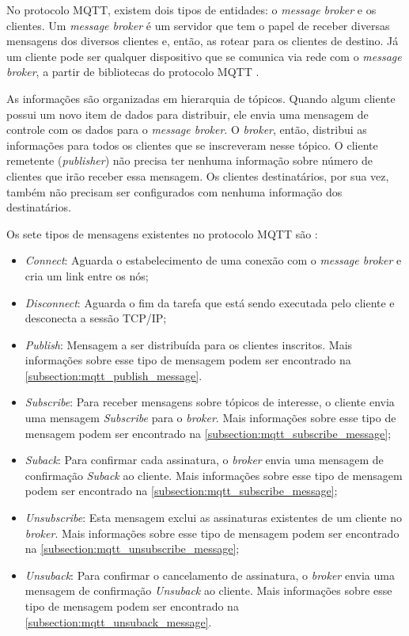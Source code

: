 No protocolo MQTT, existem dois tipos de entidades: o \textit{message broker} e os clientes. Um \textit{message broker} é um servidor que tem o papel de receber diversas mensagens dos diversos clientes e, então, as rotear para os clientes de destino. Já um cliente pode ser qualquer dispositivo que se comunica via rede com o \textit{message broker}, a partir de bibliotecas do protocolo MQTT \cite{ref:025}.

As informações são organizadas em hierarquia de tópicos. Quando algum cliente possui um novo item de dados para distribuir, ele envia uma mensagem de controle com os dados para o \textit{message broker}. O \textit{broker}, então, distribui as informações para todos os clientes que se inscreveram nesse tópico. O cliente remetente (\textit{publisher}) não precisa ter nenhuma informação sobre número de clientes que irão receber essa mensagem. Os clientes destinatários, por sua vez, também não precisam ser configurados com nenhuma informação dos destinatários.

Os sete tipos de mensagens existentes no protocolo MQTT são \cite{ref:025}:

\begin{itemize}
    \item \textit{Connect}: Aguarda o estabelecimento de uma conexão com o \textit{message broker} e cria um link entre os nós;
    \item \textit{Disconnect}: Aguarda o fim da tarefa que está sendo executada pelo cliente e desconecta a sessão TCP/IP;
    \item \textit{Publish}: Mensagem a ser distribuída para os clientes inscritos. Mais informações sobre esse tipo de mensagem podem ser encontrado na \autoref{subsection:mqtt_publish_message}.
    \item \textit{Subscribe}: Para receber mensagens sobre tópicos de interesse, o cliente envia uma mensagem \textit{Subscribe} para o \textit{broker}. Mais informações sobre esse tipo de mensagem podem ser encontrado na \autoref{subsection:mqtt_subscribe_message};
    \item \textit{Suback}: Para confirmar cada assinatura, o \textit{broker} envia uma mensagem de confirmação \textit{Suback} ao cliente. Mais informações sobre esse tipo de mensagem podem ser encontrado na \autoref{subsection:mqtt_subscribe_message};
    \item \textit{Unsubscribe}: Esta mensagem exclui as assinaturas existentes de um cliente no \textit{broker}. Mais informações sobre esse tipo de mensagem podem ser encontrado na \autoref{subsection:mqtt_unsubscribe_message};
    \item \textit{Unsuback}: Para confirmar o cancelamento de assinatura, o \textit{broker} envia uma mensagem de confirmação \textit{Unsuback} ao cliente. Mais informações sobre esse tipo de mensagem podem ser encontrado na \autoref{subsection:mqtt_unsuback_message}.
\end{itemize}

